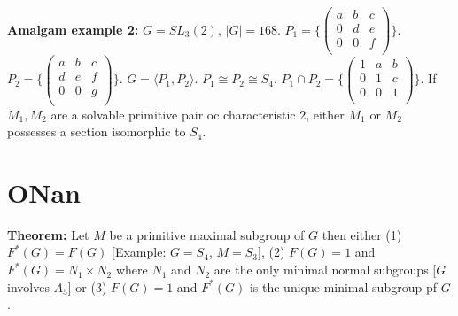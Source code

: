 \\
\\
{\bf Amalgam example 2:} $G= SL_3(2)$, $|G|=168$.
$P_1 = \{\left(
\begin{array}{ccc}
a & b & c \\
0 & d & e \\
0 & 0 & f \\
\end{array}
\right) \}$.
$P_2 = \{\left(
\begin{array}{ccc}
a & b & c \\
d & e & f \\
0 & 0 & g \\
\end{array}
\right) \}$. $G=\langle P_1, P_2\rangle$. $P_1 \cong P_2 \cong S_4$.
$P_1 \cap P_2 = \{\left(
\begin{array}{ccc}
1 & a & b \\
0 & 1 & c \\
0 & 0 & 1 \\
\end{array}
\right) \}$.  If $M_1, M_2$ are a solvable primitive pair oc characteristic $2$, either $M_1$ or $M_2$ possesses a section isomorphic
to $S_4$.
\section {ONan}
{\bf Theorem:} Let $M$ be a primitive maximal subgroup of $G$ then either (1) $F^*(G)=F(G)$ [Example: $G=S_4$, $M=S_3$], (2)
$F(G)= 1$ and $F^*(G) = N_1 \times N_2$ where $N_1$ and $N_2$ are the only minimal normal subgroups
[$G$ involves $A_5$] or (3) $F(G)=1$ and $F^*(G)$ is the unique minimal subgroup pf $G$.

